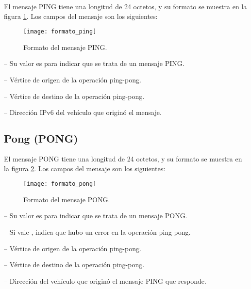 \label{subsec:mensaje_ping}

El mensaje PING tiene una longitud de 24 octetos, y su formato se muestra en la
figura \ref{fig:formato_ping}. Los campos del mensaje son los siguientes:

\begin{figure}[th!]
\centering
\texttt{[image: formato\_ping]}
\decoRule
\caption[Formato del mensaje PING]{Formato del mensaje PING.}
\label{fig:formato_ping}
\end{figure}

 -- Su valor es  para indicar que se trata de un
mensaje PING.

 -- Vértice de origen de la operación
ping-pong.

 -- Vértice de destino de la operación
ping-pong.

 -- Dirección IPv6 del vehículo que originó
el mensaje.

\subsection{Pong (PONG)}

\label{subsec:mensaje_pong}

El mensaje PONG tiene una longitud de 24 octetos, y su formato se muestra en la
figura \ref{fig:formato_pong}. Los campos del mensaje son los siguientes:

\begin{figure}[th!]
\centering
\texttt{[image: formato\_pong]}
\decoRule
\caption[Formato del mensaje PONG]{Formato del mensaje PONG.}
\label{fig:formato_pong}
\end{figure}

 -- Su valor es  para indicar que se trata de un
mensaje PONG.

 -- Si vale , indica que hubo un error en la
operación ping-pong.

 -- Vértice de origen de la operación
ping-pong.

 -- Vértice de destino de la operación
ping-pong.

 -- Dirección del vehículo que originó el
mensaje PING que responde.

